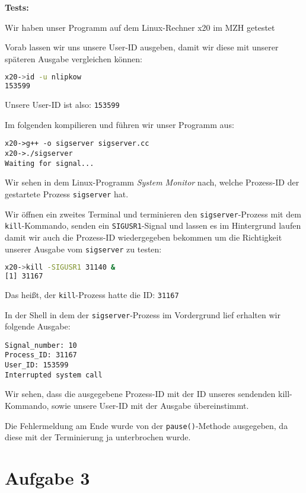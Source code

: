 \documentclass{ti2}
\begin{document}
\textbf{Tests:}

Wir haben unser Programm auf dem Linux-Rechner x20 im MZH getestet

Vorab lassen wir uns unsere User-ID ausgeben, damit wir diese mit unserer späteren Ausgabe vergleichen können:

\begin{lstlisting}[title=bash-Prozess 1, language=bash]
x20->id -u nlipkow 
153599
\end{lstlisting}
Unsere User-ID ist also: \texttt{153599}

Im folgenden kompilieren und führen wir unser Programm aus:

\begin{lstlisting}[title=bash-Prozess 1, firstnumber=last]
x20->g++ -o sigserver sigserver.cc 
x20->./sigserver 
Waiting for signal...
\end{lstlisting}

Wir sehen in dem Linux-Programm \textit{System Monitor} nach, welche Prozess-ID der gestartete Prozess \texttt{sigserver} hat.

Wir öffnen ein zweites Terminal und terminieren den \texttt{sigserver}-Prozess mit dem \texttt{kill}-Kommando, senden ein \texttt{SIGUSR1}-Signal und lassen es im Hintergrund laufen damit wir auch die Prozess-ID wiedergegeben bekommen um die Richtigkeit unserer Ausgabe vom \texttt{sigserver} zu testen:

\begin{lstlisting}[title=bash-Prozess 2, language=bash]
x20->kill -SIGUSR1 31140 &         
[1] 31167
\end{lstlisting}

Das heißt, der \texttt{kill}-Prozess hatte die ID: \texttt{31167}

In der Shell in dem der \texttt{sigserver}-Prozess im Vordergrund lief erhalten wir folgende Ausgabe:

\begin{lstlisting}[title=bash-Prozess 1, firstnumber=6]
Signal_number: 10
Process_ID: 31167
User_ID: 153599
Interrupted system call
\end{lstlisting}

Wir sehen, dass die ausgegebene Prozess-ID mit der ID unseres sendenden kill-Kommando, sowie unsere User-ID mit der Ausgabe übereinstimmt.

Die Fehlermeldung am Ende wurde von der \texttt{pause()}-Methode ausgegeben, da diese mit der Terminierung ja unterbrochen wurde.

\section*{Aufgabe 3}
\end{document}
